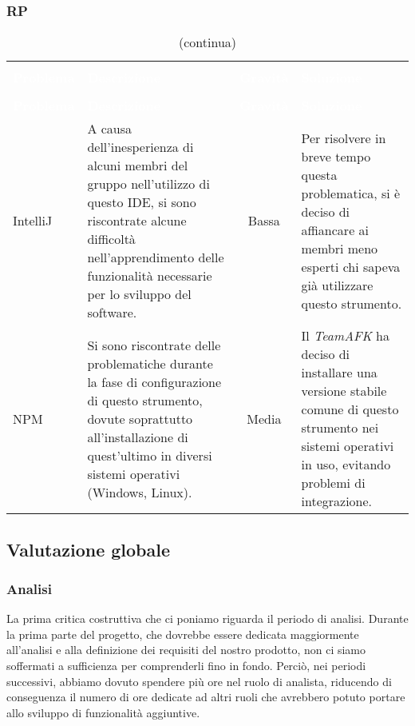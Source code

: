 \subsubsection{RP}
\begin{longtable}{ C{2.3cm} L{5.5cm} c L{5.5cm} }
\caption{Problematiche relative agli strumenti di lavoro durante la RP}\\
\textcolor{white}{\textbf{Problema}} & \centerline{\textcolor{white}{\textbf{Descrizione}}} & \textcolor{white}{\textbf{Gravità}} & \centerline{\textcolor{white}{\textbf{Soluzione}}}\\
		\endfirsthead
		\caption[]{(continua)} \\
\textcolor{white}{\textbf{Problema}} & \centerline{\textcolor{white}{\textbf{Descrizione}}} & \textcolor{white}{\textbf{Gravità}} & \centerline{\textcolor{white}{\textbf{Soluzione}}}\\
		\endhead
IntelliJ & A causa dell’inesperienza di alcuni membri del gruppo nell’utilizzo
di questo IDE, si sono riscontrate alcune difficoltà nell'apprendimento delle funzionalità necessarie per lo sviluppo del software. & Bassa & Per risolvere in breve tempo questa problematica, si è deciso di affiancare ai membri meno esperti chi sapeva già utilizzare questo strumento. \\
NPM & Si sono riscontrate delle problematiche durante la fase di configurazione di questo strumento, dovute soprattutto all'installazione di quest'ultimo in diversi sistemi operativi (Windows, Linux). & Media & Il \textit{TeamAFK} ha deciso di installare una versione stabile comune di questo strumento nei sistemi operativi in uso, evitando problemi di integrazione.
\end{longtable}

\pagebreak
\subsection{Valutazione globale}

\subsubsection{Analisi}
La prima critica costruttiva che ci poniamo riguarda il periodo di analisi.
Durante la prima parte del progetto, che dovrebbe essere dedicata maggiormente
all’analisi e alla definizione dei requisiti del nostro prodotto, non
ci siamo soffermati a sufficienza per comprenderli fino in fondo. Perciò, nei
periodi successivi, abbiamo dovuto spendere più ore nel ruolo di analista, riducendo
di conseguenza il numero di ore dedicate ad altri ruoli che avrebbero
potuto portare allo sviluppo di funzionalità aggiuntive.

